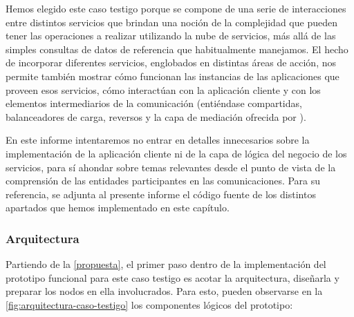 Hemos elegido este caso testigo porque se compone de una serie de interacciones entre distintos servicios que brindan una noción de la complejidad que pueden tener las operaciones a realizar utilizando la nube de servicios, más allá de las simples consultas de datos de referencia que habitualmente manejamos. El hecho de incorporar diferentes servicios, englobados en distintas áreas de acción, nos permite también mostrar cómo funcionan las instancias de las aplicaciones que proveen esos servicios, cómo interactúan con la aplicación cliente y con los elementos intermediarios de la comunicación (entiéndase  compartidas, balanceadores de carga,  reversos y la capa de mediación ofrecida por ).

En este informe intentaremos no entrar en detalles innecesarios sobre la implementación de la aplicación cliente ni de la capa de lógica del negocio de los servicios, para sí ahondar sobre temas relevantes desde el punto de vista de la comprensión de las entidades participantes en las comunicaciones. Para su referencia, se adjunta al presente informe el código fuente de los distintos apartados que hemos implementado en este capítulo.


\subsubsection{Arquitectura}

Partiendo de la \autoref{propuesta}, el primer paso dentro de la implementación del prototipo funcional para este caso testigo es acotar la arquitectura, diseñarla y preparar los nodos en ella involucrados. Para esto, pueden observarse en la \autoref{fig:arquitectura-caso-testigo} los componentes lógicos del prototipo:

